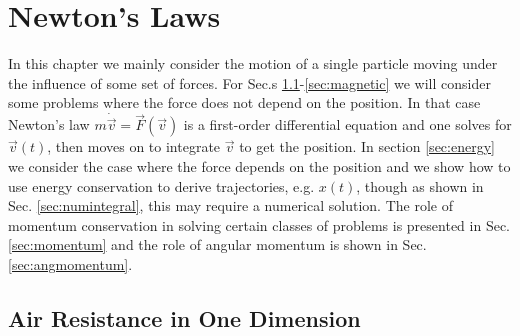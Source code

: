 \section{Newton's Laws}
\bigskip

In this chapter we mainly consider the motion of a single particle moving under the influence of some set of forces. For Sec.s \ref{sec:drag}-\ref{sec:magnetic} we will consider some problems where the force does not depend on the position. In that case Newton's law $m\dot{\vec{v}}=\vec{F}(\vec{v})$ is a first-order differential equation and one solves for $\vec{v}(t)$, then moves on to integrate $\vec{v}$ to get the position. In section \ref{sec:energy} we consider the case where the force depends on the position and we show how to use energy conservation to derive trajectories, e.g. $x(t)$, though as shown in Sec. \ref{sec:numintegral}, this may require a numerical solution. The role of momentum conservation in solving certain classes of problems is presented in Sec. \ref{sec:momentum} and the role of angular momentum is shown in Sec. \ref{sec:angmomentum}.

\subsection{Air Resistance in One Dimension}
\label{sec:drag}

